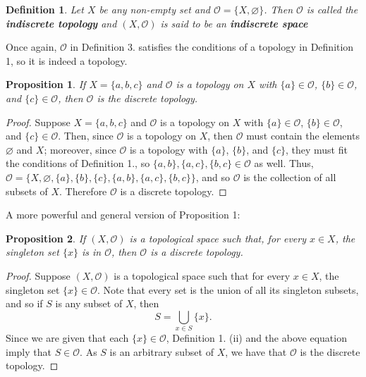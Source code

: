 \documentclass[12pt,reqno]{amsart}
\theoremstyle{plain}
\newtheorem{defi}{Definition}
\newtheorem{prop}{Proposition}
\begin{document}
\begin{defi} Let $X$ be any non-empty set and $\mathcal{O} = \{ X, \varnothing \}$. Then $\mathcal{O}$ is called the \textup{\textbf{indiscrete topology}} and $(X, \mathcal{O})$ is said to be an \textup{\textbf{indiscrete space}}
\end{defi} 

Once again, $\mathcal{O}$ in Definition 3. satisfies the conditions of a topology in Definition 1, so it is indeed a topology. 

\begin{prop} If $X = \{a, b, c \}$ and $\mathcal{O}$ is a topology on $X$ with $\{a \} \in \mathcal{O}$, $\{ b \} \in \mathcal{O}$, and $\{ c \} \in \mathcal{O}$, then $\mathcal{O}$ is the discrete topology. 
\end{prop} 
\begin{proof} Suppose $X = \{a, b, c \}$ and $\mathcal{O}$ is a topology on $X$ with $\{a \} \in \mathcal{O}$, $\{ b \} \in \mathcal{O}$, and $\{ c \} \in \mathcal{O}$. Then, since $\mathcal{O}$ is a topology on $X$, then $\mathcal{O}$ must contain the elements $\varnothing$ and $X$; moreover, since $\mathcal{O}$ is a topology with $\{a \}$, $\{b \}$, and $\{ c\}$, they must fit the conditions of Definition 1., so $\{a, b \}, \{a, c \}, \{b, c \} \in \mathcal{O}$ as well. Thus, $\mathcal{O} = \{ X, \varnothing, \{ a \}, \{b \} , \{ c \} ,\{a, b \}, \{a, c \}, \{b, c \} \}$, and so $\mathcal{O}$ is the collection of all subsets of $X$. Therefore $\mathcal{O}$ is a discrete topology. 
\end{proof}

A more powerful and general version of Proposition 1:
\begin{prop} If $(X, \mathcal{O})$ is a topological space such that, for every $x \in X$, the singleton set $\{x \}$ is in $\mathcal{O}$, then $\mathcal{O}$ is a discrete topology.
\end{prop} 
\begin{proof} Suppose $(X, \mathcal{O})$ is a topological space such that for every $x \in X$, the singleton set $\{ x \} \in \mathcal{O}$. Note that every set is the union of all its singleton subsets, and so if $S$ is any subset of $X$, then $$S = \bigcup_{x \in S} \{x \}.$$ Since we are given that each $\{ x \} \in \mathcal{O}$, Definition 1. (ii) and the above equation imply that $S \in \mathcal{O}$. As $S$ is an arbitrary subset of $X$, we have that $\mathcal{O}$ is the discrete topology.
\end{proof}
\end{document}
